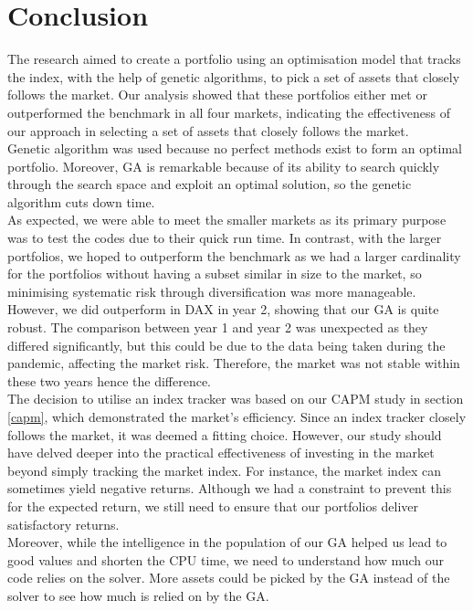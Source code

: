 \documentclass[12pt]{report}
\begin{document}
{\chapter{Conclusion}
The research aimed to create a portfolio using an optimisation model that tracks the index, with the help of genetic algorithms, to pick a set of assets that closely follows the market. Our analysis showed that these portfolios either met or outperformed the benchmark in all four markets, indicating the effectiveness of our approach in selecting a set of assets that closely follows the market.
\\ \newline \noindent
Genetic algorithm was used because no perfect methods exist to form an optimal portfolio. Moreover, GA is remarkable because of its ability to search quickly through the search space and exploit an optimal solution, so the genetic algorithm cuts down time. 
\\ \newline \noindent
As expected, we were able to meet the smaller markets as its primary purpose was to test the codes due to their quick run time. In contrast, with the larger portfolios, we hoped to outperform the benchmark as we had a larger cardinality for the portfolios without having a subset similar in size to the market, so minimising systematic risk through diversification was more manageable. However, we did outperform in DAX in year 2, showing that our GA is quite robust. The comparison between year 1 and year 2 was unexpected as they differed significantly, but this could be due to the data being taken during the pandemic, affecting the market risk. Therefore, the market was not stable within these two years hence the difference. 
\\ \newline \noindent
The decision to utilise an index tracker was based on our CAPM study in section \ref{capm}, which demonstrated the market's efficiency. Since an index tracker closely follows the market, it was deemed a fitting choice. However, our study should have delved deeper into the practical effectiveness of investing in the market beyond simply tracking the market index. For instance, the market index can sometimes yield negative returns. Although we had a constraint to prevent this for the expected return, we still need to ensure that our portfolios deliver satisfactory returns.
\\ \newline \noindent
Moreover, while the intelligence in the population of our GA helped us lead to good values and shorten the CPU time, we need to understand how much our code relies on the solver. More assets could be picked by the GA instead of the solver to see how much is relied on by the GA.
}
\end{document}
